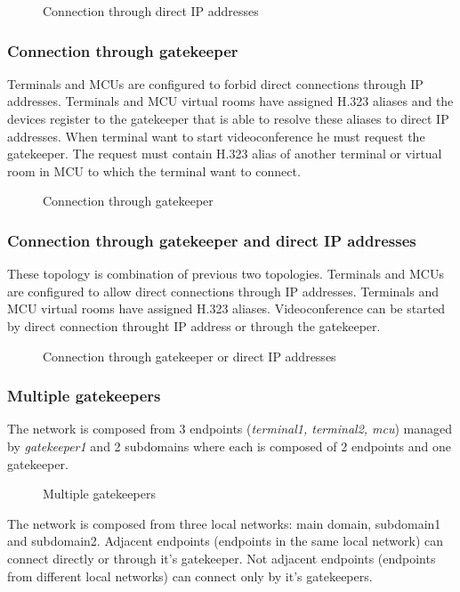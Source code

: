 \documentclass[a4paper]{report}
\newcommand{\graph}[4]{
\begin{figure}[h!]
\centering\scalebox{\ifx&#4& 0.75 \else #4 \fi}{}
\label{#1}
\caption{#3}
\end{figure}
}
\begin{document}
\graph{graph:h323:direct}{graph/h323_direct.tex}{Connection through direct IP addresses}{}


\subsubsection{Connection through gatekeeper}

Terminals and MCUs are configured to forbid direct connections through IP addresses. Terminals and MCU virtual rooms have assigned H.323 aliases and the devices register to the gatekeeper that is able to resolve these aliases to direct IP addresses. When terminal want to start videoconference he must request the gatekeeper. The request must contain H.323 alias of another terminal or virtual room in MCU to which the terminal want to connect.

\graph{graph:h323:gatekeeper}{graph/h323_gatekeeper.tex}{Connection through gatekeeper}{}


\subsubsection{Connection through gatekeeper and direct IP addresses}

These topology is combination of previous two topologies. Terminals and MCUs are configured to allow direct connections through IP addresses. Terminals and MCU virtual rooms have assigned H.323 aliases. Videoconference can be started by direct connection throught IP address or through the gatekeeper.

\graph{graph:h323:gatekeeper}{graph/h323_gatekeeper_or_direct.tex}{Connection through gatekeeper or direct IP addresses}{0.7}


\subsubsection{Multiple gatekeepers}

The network is composed from 3 endpoints (\emph{terminal1, terminal2, mcu}) managed by \emph{gatekeeper1} and 2 subdomains where each is composed of 2 endpoints and one gatekeeper. 
\graph{graph:h323:gatekeeperMultiple}{graph/h323_gatekeeper_multiple.tex}{Multiple gatekeepers}{0.7}
The network is composed from three local networks: main domain, subdomain1 and subdomain2. Adjacent endpoints (endpoints in the same local network) can connect directly or through it's gatekeeper. Not adjacent endpoints (endpoints from different local networks) can connect only by it's gatekeepers.
\end{document}
